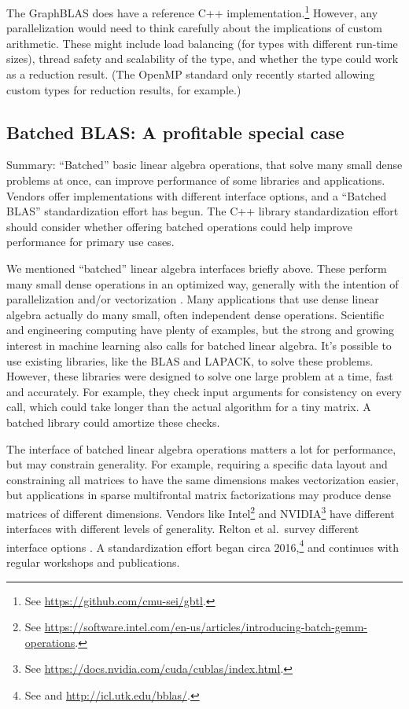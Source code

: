 The GraphBLAS does have a reference C++ implementation.\footnote{See
  \url{https://github.com/cmu-sei/gbtl}.}  However, any
parallelization would need to think carefully about the implications
of custom arithmetic.  These might include load balancing (for types
with different run-time sizes), thread safety and scalability of the
type, and whether the type could work as a reduction result.  (The
OpenMP standard only recently started allowing custom types for
reduction results, for example.)

\subsection{Batched BLAS: A profitable special case}
\label{SS:other-standards:batched}

Summary: ``Batched'' basic linear algebra operations, that solve many
small dense problems at once, can improve performance of some
libraries and applications.  Vendors offer implementations with
different interface options, and a ``Batched BLAS'' standardization
effort has begun.  The C++ library standardization effort should
consider whether offering batched operations could help improve
performance for primary use cases.

We mentioned ``batched'' linear algebra interfaces briefly above.
These perform many small dense operations in an optimized way,
generally with the intention of parallelization and/or vectorization
\cite{dongarra2016batched}.  Many applications that use dense linear
algebra actually do many small, often independent dense operations.
Scientific and engineering computing have plenty of examples, but the
strong and growing interest in machine learning also calls for batched
linear algebra.  It's possible to use existing libraries, like the
BLAS and LAPACK, to solve these problems.  However, these libraries
were designed to solve one large problem at a time, fast and
accurately.  For example, they check input arguments for consistency
on every call, which could take longer than the actual algorithm for a
tiny matrix.  A batched library could amortize these checks.

The interface of batched linear algebra operations matters a lot for
performance, but may constrain generality.  For example, requiring a
specific data layout and constraining all matrices to have the same
dimensions makes vectorization easier, but applications in sparse
multifrontal matrix factorizations may produce dense matrices of
different dimensions.  Vendors like Intel\footnote{See
  \url{https://software.intel.com/en-us/articles/introducing-batch-gemm-operations}.}
and NVIDIA\footnote{See
  \url{https://docs.nvidia.com/cuda/cublas/index.html}.} have
different interfaces with different levels of generality.  Relton et
al.\ survey different interface options \cite{relton2016comparison}.
A standardization effort began circa 2016,\footnote{See
  \cite{dongarra2016batched} and \url{http://icl.utk.edu/bblas/}.}
and continues with regular workshops and publications.

